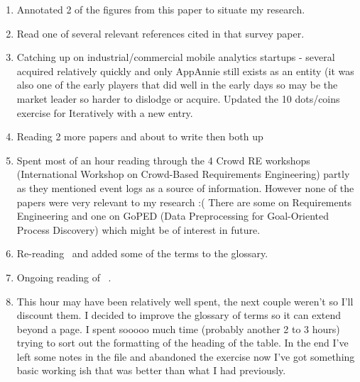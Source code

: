 \begin{enumerate}
    \item Annotated 2 of the figures from this paper to situate my research.
    \item Read one of several relevant references cited in that survey paper.
    \item Catching up on industrial/commercial mobile analytics startups - several acquired relatively quickly and only AppAnnie still exists as an entity (it was also one of the early players that did well in the early days so may be the market leader so harder to dislodge or acquire. Updated the 10 dots/coins exercise for Iteratively with a new entry.
    \item Reading 2 more papers and about to write then both up~\citep{linares2015_mining_android_app_execution_traces_etc, martin2017_survey_in_app_store_analysis_for_software_engineering_IEEE_edition}
    \item Spent most of an hour reading through the 4 Crowd RE workshops (International Workshop on Crowd-Based Requirements Engineering) partly as they mentioned event logs as a source of information. However none of the papers were very relevant to my research :( There are some on Requirements Engineering and one on GoPED (Data Preprocessing for Goal-Oriented Process Discovery) which might be of interest in future.
    \item Re-reading~\citep{maalej2016_towards_data_driven_requirements_engineering} and added some of the terms to the glossary.
    \item Ongoing reading of ~\citep{maalej2016_towards_data_driven_requirements_engineering}.
    \item This hour may have been relatively well spent, the next couple weren't so I'll discount them. I decided to improve the glossary of terms so it can extend beyond a page. I spent sooooo much time (probably another 2 to 3 hours) trying to sort out the formatting of the heading of the table. In the end I've left some notes in the file and abandoned the exercise now I've got something basic working ish that was better than what I had previously. 
\end{enumerate}
